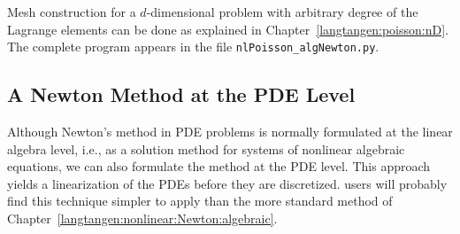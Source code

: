 Mesh construction for a $d$-dimensional problem with arbitrary degree of
the Lagrange elements can be done as
explained in Chapter~\ref{langtangen:poisson:nD}. 
The complete program appears in the file {\fontsize{12pt}{12pt}\verb!nlPoisson_algNewton.py!}.


\subsection{A Newton Method at the PDE Level}
\label{langtangen:nonlinear:Newton:pdelevel}

Although Newton's method in PDE problems is normally formulated at the
linear algebra level, i.e., as a solution method for systems of nonlinear
algebraic equations, we can also formulate the method at the PDE level.
This approach yields a linearization of the PDEs before they are discretized.
\fenics{} users will probably find this technique simpler to apply than
the more standard method of Chapter~\ref{langtangen:nonlinear:Newton:algebraic}.

